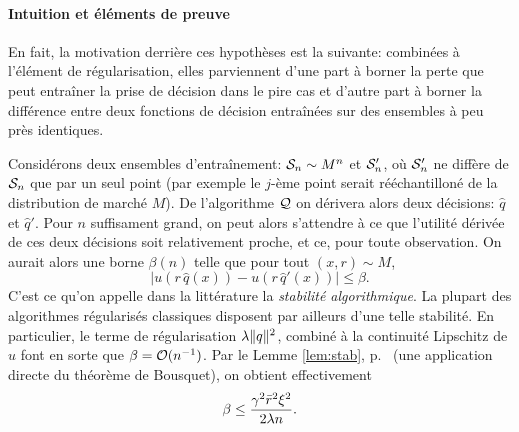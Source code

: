 

\paragraph{Intuition et éléments de preuve}

En fait, la motivation derrière ces hypothèses est la suivante: combinées à l'élément de
régularisation, elles parviennent d'une part à borner la perte que peut entraîner la prise
de décision dans le pire cas et d'autre part à borner la différence entre deux fonctions
de décision entraînées sur des ensembles à peu près identiques.

Considérons deux ensembles d'entraînement: $\S_n \sim M^n$ et $\S'_n$, où $\S'_n$ ne diffère
de $\S_n$ que par un seul point (par exemple le $j$-ème point serait rééchantilloné de la
distribution de marché $M$). De l'algorithme $\alg$ on dérivera alors deux décisions:
$\hat q$ et $\hat q'$. Pour $n$ suffisament grand, on peut alors s'attendre à ce que
l'utilité dérivée de ces deux décisions soit relativement proche, et ce, pour toute
observation. On aurait alors une borne $\beta(n)$ telle que pour tout $(x,r) \sim M$,
\begin{equation}
  |u(r\,\hat q(x)) - u(r\,\hat q'(x))| \leq \beta.
\end{equation}
C'est ce qu'on appelle dans la littérature la \textit{stabilité algorithmique}. La plupart
des algorithmes régularisés classiques disposent par ailleurs d'une telle stabilité. En
particulier, le terme de régularisation $\lambda \nq{q}^2$, combiné à la continuité Lipschitz de
$u$ font en sorte que $\beta = \O(n^{-1})$. Par le Lemme \ref{lem:stab}, p.~\pageref{lem:stab}
(une application directe du théorème de Bousquet), on obtient effectivement
\begin{equation}
  \beta \leq \frac{\gamma^2\rmax^2\xi^2}{2\lambda n}.
\end{equation}

